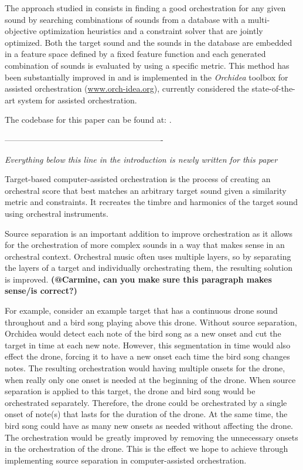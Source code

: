 \documentclass{article}
\begin{document}
	The approach studied in \cite{Carpentier2010} consists in finding a good orchestration for any given sound by searching combinations of sounds from a database with a multi-objective optimization heuristics and a constraint solver that are jointly optimized. Both the target sound and the sounds in the database are embedded in a feature space defined by a fixed feature function and each generated combination of sounds is evaluated by using a specific metric. This method has been substantially improved in \cite{Cella18, Cella2020} and is implemented in the \emph{Orchidea} toolbox for assisted orchestration (\url{www.orch-idea.org}), currently considered the state-of-the-art system for assisted orchestration.

	 The codebase for this paper can be found at: \url{}.
	 
	 ----------------------------------------------------------
	 
	 \textit{Everything below this line in the introduction is newly written for this paper}
	 
	 Target-based computer-assisted orchestration is the process of creating an orchestral score that best matches an arbitrary target sound given a similarity metric and constraints. It recreates the timbre and harmonics of the target sound using orchestral instruments. 
		
		Source separation is an important addition to improve orchestration as it allows for the orchestration of more complex sounds in a way that makes sense in an orchestral context. Orchestral music often uses multiple layers, so by separating the layers of a target and individually orchestrating them, the resulting solution is improved. \textbf{(@Carmine, can you make sure this paragraph makes sense/is correct?)}
		
		For example, consider an example target that has a continuous drone sound throughout and a bird song playing above this drone. Without source separation, Orchidea would detect each note of the bird song as a new onset and cut the target in time at each new note. However, this segmentation in time would also effect the drone, forcing it to have a new onset each time the bird song changes notes. The resulting orchestration would having multiple onsets for the drone, when really only one onset is needed at the beginning of the drone. When source separation is applied to this target, the drone and bird song would be orchestrated separately. Therefore, the drone could be orchestrated by a single onset of note(s) that lasts for the duration of the drone. At the same time, the bird song could have as many new onsets as needed without affecting the drone. The orchestration would be greatly improved by removing the unnecessary onsets in the orchestration of the drone. This is the effect we hope to achieve through implementing source separation in computer-assisted orchestration.
		
\end{document}
